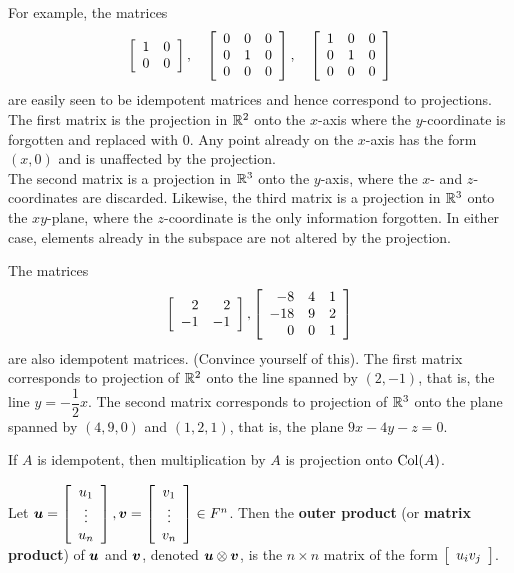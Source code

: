 \begin{Exam} For example, the matrices \[\mtx{rr}{1&0\\0&0},\quad \mtx{rrr}{0&0&0\\0&1&0\\0&0&0},\quad \mtx{rrr}{1&0&0\\0&1&0\\0&0&0}\] are easily seen to be idempotent matrices and hence correspond to projections. The first matrix is the projection in $\R^2$ onto the $x$-axis where the $y$-coordinate is forgotten and replaced with 0. Any point already on the $x$-axis has the form $(x,0)$ and is unaffected by the projection.\\

The second matrix is a projection in $\R^3$ onto the $y$-axis, where the $x$- and $z$-coordinates are discarded. Likewise, the third matrix is a projection in $\R^3$ onto the $xy$-plane, where the $z$-coordinate is the only information forgotten. In either case, elements already in the subspace are not altered by the projection.
\end{Exam}\vs

\begin{Exam} The matrices
\[\mtx{rr}{2&2\\-1&-1}, \mtx{rrr}{-8&4&1\\-18&9&2\\0&0&1}\] are also idempotent matrices. (Convince yourself of this). The first matrix corresponds to projection of $\R^2$ onto the line spanned by $(2,-1)$, that is, the line $y=-\dfrac{1}{2}x$. The second matrix corresponds to projection of  $\R^3$ onto the plane spanned by $(4,9,0)$ and $(1,2,1)$, that is, the plane $9x-4y-z=0$. 
\end{Exam}\vs

If $A$ is idempotent, then multiplication by $A$ is projection onto $\col(A)$.\\


\begin{Def} Let $\bb u = \mtx{c}{u_1\\\vdots\\u_n}, \bb v = \mtx{c}{v_1\\\vdots\\v_n} \in F^n$. Then the \textbf{outer product} (or \textbf{matrix product})  of $\bb u$ and $\bb v$, denoted $\bb u \otimes \bb v$, is the $n\times n$ matrix of the form $\mtx{c}{u_iv_j}$.
\end{Def}\vs

